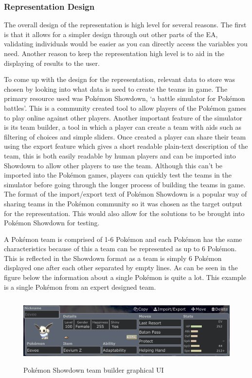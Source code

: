 \documentclass[a4paper]{article}
\newcommand{\Pokemon}{Pok\'{e}mon}
\begin{document}
\subsubsection{Representation Design}
\par
The overall design of the representation is high level for several reasons.
The first is that it allows for a simpler design through out other parts of the EA, validating individuals would be easier as you can directly access the variables you need.
Another reason to keep the representation high level is to aid in the displaying of results to the user.
\par
To come up with the design for the representation, relevant data to store was chosen by looking into what data is need to create the teams in game.
The primary resource used was \Pokemon{} Showdown, `a battle simulator for \Pokemon{} battles'\cite{showdown}.
This is a community created tool to allow players of the \Pokemon{} games to play online against other players.
Another important feature of the simulator is its team builder, a tool in which a player can create a team with aids such as filtering of choices and simple sliders.
Once created a player can share their team using the export feature which gives a short readable plain-text description of the team, this is both easily readable by human players and can be imported into Showdown to allow other players to use the team.
Although this can't be imported into the \Pokemon{} games, players can quickly test the teams in the simulator before going through the longer process of building the teams in game.
The format of the import/export text of \Pokemon{} Showdown is a popular way of sharing teams in the \Pokemon{} community so it was chosen as the target output for the representation.
This would also allow for the solutions to be brought into \Pokemon{} Showdown for testing.
\par
A \Pokemon{} team is comprised of 1-6 \Pokemon{} and each \Pokemon{} has the same characteristics because of this a team can be represented as up to 6 \Pokemon{}.
This is reflected in the Showdown format as a team is simply 6 \Pokemon{} displayed one after each other separated by empty lines.
As can be seen in the figure below the information about a single \Pokemon{} is quite a lot.
This example is a single \Pokemon{} from an expert designed team.
\begin{figure}[H]
	\centering
	\includegraphics[height=3.5cm]{showdownTeamBuilder.png}
	\caption{\Pokemon{} Showdown team builder graphical UI}
\end{figure}
\end{document}
